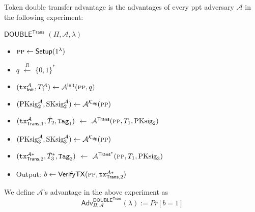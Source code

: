 \begin{definition}
            \label{def:Token double transfer advantage}
            Token double transfer advantage is the advantages of every \gls{ppt} adversary $\mathcal{A}$ in the following experiment:

            $\mathsf{DOUBLE}^\mathsf{Trans}$  $(\Pi, \mathcal{A}, \lambda)$
            \begin{itemize}
                \item [] $\textsc{pp} \leftarrow \textsf{Setup}(1^\lambda)$ 

                
                    \item [] $q$ $\xleftarrow{R}$ $\{0, 1\}^*$ 
                    \item [] $(\texttt{tx}_{\mathsf{Init}}^\mathcal{A}, T_1^\mathcal{A}) \leftarrow \mathcal{A}^\textsf{Init}(\textsc{pp}, q)$
                
                \item[] $(\text{PKsig}^\mathcal{A}_2, \text{SKsig}^\mathcal{A}_2) \leftarrow \mathcal{A}^{\mathcal{K}_\mathsf{sig}}(\textsc{pp})  $ 
                
                \item[] $(\texttt{tx}_{\mathsf{Trans},1}^\mathcal{A}, \Tilde{T}_2, \texttt{Tag}_1)$ $\leftarrow$ $\mathcal{A}^\mathsf{Trans}(\textsc{pp}, T_1, \text{PKsig}_2)$

                \item[] $(\text{PKsig}^\mathcal{A}_3, \text{SKsig}^\mathcal{A}_3) \leftarrow \mathcal{A}^{\mathcal{K}_\mathsf{sig}}(\textsc{pp})  $ 
                
                \item[] $(\texttt{tx}_{\mathsf{Trans},2}^{\mathcal{A}\ast}, \Tilde{T}^\ast_3, \texttt{Tag}_2)$ $\leftarrow$ $\mathcal{A}^{\mathsf{Trans}^\ast}(\textsc{pp}, T_1, \text{PKsig}_3)$
                
                
                \item[] Output: $b \leftarrow \mathsf{VerifyTX}(\textsc{pp}, \texttt{tx}_{\mathsf{Trans},2}^{\mathcal{A}\ast})$
        \end{itemize}
        We define $\mathcal{A}$'s advantage in the above experiment as
\begin{equation}
\label{eq:Adv_DOUBLE}
    \mathsf{Adv}^{\mathsf{DOUBLE}^\mathsf{Trans}}_{\Pi, \mathcal{A}}(\lambda) := Pr[b=1]
\end{equation}
\end{definition}


